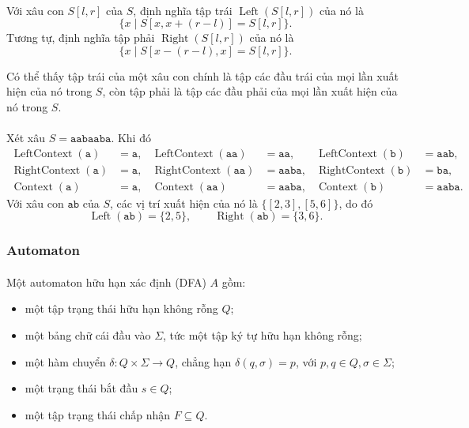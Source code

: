 \documentclass[11pt]{article}
\begin{document}
\paragraph{}
Với xâu con \(S[l,r]\) của \(S\), định nghĩa tập trái
\(\operatorname{Left}(S[l,r])\) của nó là
\[
\{x\mid S[x,x+(r-l)]=S[l,r]\}.
\]
Tương tự, định nghĩa tập phải \(\operatorname{Right}(S[l,r])\) của nó là
\[
\{x\mid S[x-(r-l),x]=S[l,r]\}.
\]

Có thể thấy tập trái của một xâu con chính là tập các đầu trái của mọi lần xuất
hiện của nó trong \(S\), còn tập phải là tập các đầu phải của mọi lần xuất hiện
của nó trong \(S\).

\paragraph{}
Xét xâu \(S=\texttt{aabaaba}\). Khi đó
\[
\begin{aligned}
\operatorname{LeftContext}(\texttt{a})&=\texttt{a},&
\operatorname{LeftContext}(\texttt{aa})&=\texttt{aa},&
\operatorname{LeftContext}(\texttt{b})&=\texttt{aab},\\
\operatorname{RightContext}(\texttt{a})&=\texttt{a},&
\operatorname{RightContext}(\texttt{aa})&=\texttt{aaba},&
\operatorname{RightContext}(\texttt{b})&=\texttt{ba},\\
\operatorname{Context}(\texttt{a})&=\texttt{a},&
\operatorname{Context}(\texttt{aa})&=\texttt{aaba},&
\operatorname{Context}(\texttt{b})&=\texttt{aaba}.
\end{aligned}
\]
Với xâu con \(\texttt{ab}\) của \(S\), các vị trí xuất hiện của nó là
\(\{[2,3],[5,6]\}\), do đó
\[
\operatorname{Left}(\texttt{ab})=\{2,5\},\qquad
\operatorname{Right}(\texttt{ab})=\{3,6\}.
\]

\subsubsection{Automaton}

\paragraph{}
Một automaton hữu hạn xác định (DFA) \(A\) gồm:

\begin{itemize}
  \item một tập trạng thái hữu hạn không rỗng \(Q\);
  \item một bảng chữ cái đầu vào \(\Sigma\), tức một tập ký tự hữu hạn không
  rỗng;
  \item một hàm chuyển \(\delta:Q\times\Sigma\to Q\), chẳng hạn
  \(\delta(q,\sigma)=p\), với \(p,q\in Q,\sigma\in\Sigma\);
  \item một trạng thái bắt đầu \(s\in Q\);
  \item một tập trạng thái chấp nhận \(F\subseteq Q\).
\end{itemize}
\end{document}
